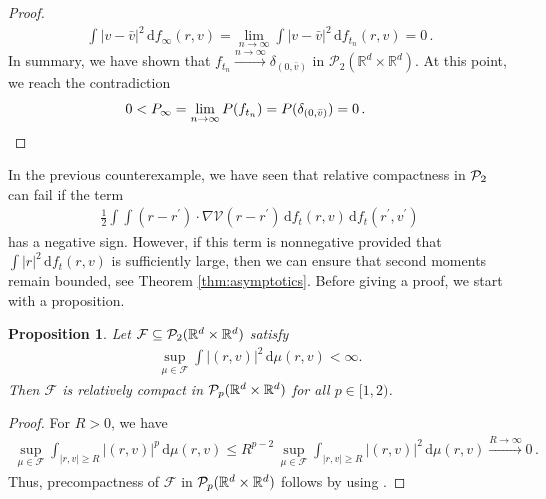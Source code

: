 \documentclass[11pt]{article}
\newtheorem{proposition}[theorem]{Proposition}
\newcommand{\R}[0]{\mathbb R}
\newcommand{\abs}[1]{\left| #1 \right|}
\newcommand{\Pp}[1]{
    \ifx #1\infty
        \mathcal{P}_{c}
    \else 
        \mathcal{P}_{#1}
    \fi 
}
\newcommand{\msolt}[2]{f_{#1}(#2)}
\newcommand{\Pfunc}{P}
\begin{document}
\begin{bibunit}[unsrtnat]
\begin{proof}
        \begin{align*}
            \int \abs{v-\bar{v}}^{2} \, \mathrm{d}f_\infty(r,v) = \lim\limits_{n \to \infty } \int \abs{v-\bar{v}}^{2} \, \mathrm{d}\msolt{t_n}{r,v} = 0 \, . 
        \end{align*}
        In summary, we have shown that $f_{t_n}  \stackrel{n \to \infty}{\to} \delta_{(0,\bar{v})}$ in $\mathcal{P}_2(\R^d \times \R^d)$. At this point, we reach the contradiction
        \begin{align*}
            0 < P_\infty = \lim_{n \to \infty} \Pfunc (f_{t_n}) = \Pfunc (\delta_{(0,\bar{v})}) = 0 \, . \qquad \qedhere
        \end{align*}
    \end{proof}
    In the previous counterexample, we have seen that relative compactness in $\Pp{2}$ can fail if the term 
    \begin{align*}
        \frac{1}{2} \int \int (r-r^\prime) \cdot \nabla \mathcal{V}(r-r^\prime) \, \mathrm{d} \msolt{t}{r,v} \, \mathrm{d}\msolt{t}{r^\prime, v^\prime}
    \end{align*}
    has a negative sign. However, if this term is nonnegative provided that $\int \abs{r}^2 \, \mathrm{d} \msolt{t}{r,v}$ is sufficiently large, then we can ensure that second moments remain bounded, see Theorem \ref{thm:asymptotics}. Before giving a proof, we start with a proposition.
    \begin{proposition}\label{prop:compactness}
        Let $\mathcal{F} \subseteq \Pp{2}(\R^d \times \R^d)$ satisfy 
        \begin{align*}
            \sup\limits_{\mu \in \mathcal{F}} \int \abs{(r,v)}^2 \, \mathrm{d}\mu(r,v) < \infty. 
        \end{align*}
        Then $\mathcal{F}$ is relatively compact in $\Pp{p} (\R^d \times \R^d)$ for all $p \in [1,2)$. 
    \end{proposition}
    \begin{proof}
        For $R > 0$, we have 
        \begin{align*}
            \sup\limits_{\mu \in \mathcal{F}} \int_{\abs{r,v}\geq R} \abs{(r,v)}^p \, \mathrm{d} \mu(r,v) \leq R^{p-2} \,   \sup\limits_{\mu \in \mathcal{F}} \int_{\abs{r,v}\geq R} \abs{(r,v)}^2 \, \mathrm{d} \mu(r,v)
            \stackrel{R \to \infty}{\to} 0 \, .
        \end{align*}
        Thus, precompactness of $\mathcal{F}$ in $\Pp{p}(\R^d \times \R^d)$ follows by using \cite[Proposition $2.2.3$]{panaretos2020invitation}. 
    \end{proof}


\end{bibunit}
\end{document}
